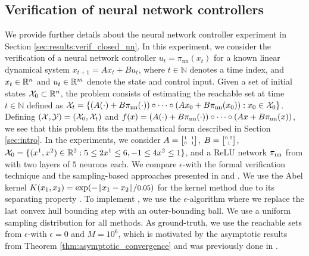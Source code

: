 \documentclass[12pt]{l4dc2022} %
\begin{document}
\subsection{Verification of neural network controllers}\label{apdx:exps:nn}
We provide further details about the neural network controller experiment in Section \ref{sec:results:verif_closed_nn}. 
In this experiment, we consider the verification of a neural network controller $u_t=\pi_{\textrm{nn}}(x_t)$ for a known linear dynamical system $x_{t+1}=Ax_t+Bu_t$, where $t\in\mathbb{N}$ denotes a time index, and $x_t\in\mathbb{R}^n$ and $u_t\in\mathbb{R}^m$ denote the state and control input. %
Given a set of initial states $\mathcal{X}_0\subset\mathbb{R}^n$, 
% 
the problem consists of estimating the reachable set at time $t\in\mathbb{N}$ defined as
$
\mathcal{X}_t=\{(A(\cdot)+B\pi_{\textrm{nn}}(\cdot))\circ\dots\circ 
(Ax_0+B\pi_{\textrm{nn}}(x_0)): x_0\in\mathcal{X}_0\}$. 
Defining $(\mathcal{X},\mathcal{Y})=(\mathcal{X}_0,\mathcal{X}_t)$ and $f(x)=(A(\cdot)+B\pi_{\textrm{nn}}(\cdot))\circ\dots\circ 
(Ax+B\pi_{\textrm{nn}}(x))$, we see that this problem fits the mathematical form described in Section \ref{sec:intro}. %
% 
In the experiments, we consider $A=\SmallMatrix{
1&1\\0&1
}$, $B=\SmallMatrix{
0.5\\1
}$, %
% 
% 
% 
$
% 
% 
% 
% 
% 
% 
% 
% 
% 
% 
% 
% 
% 
% 
\X_0=\{(x^1,x^2)\in\R^2:
5\leq 2x^1\leq 6, -1\leq 4x^2\leq 1
\}
$, and %
% 
a ReLU network $\pi_{\textrm{nn}}$ from \citep{Everett21_journal} with two layers of $5$ neurons each. 
We compare $\epsilon$-\randup with the formal verification technique \reachlp \citep{Everett21_journal} %
% 
and the sampling-based approaches presented in %
\citep{ThorpeL4DC2021} and %
\citep{Gruenbacher2021}. 
% 
We use the Abel kernel $K(x_1,x_2)=\exp(-\|x_1-x_2\|/\scalebox{0.9}{$0.05$})$ for the kernel method \citep{ThorpeL4DC2021} due to its separating property \citep{DeVito2014}. 
% 
To implement \gotube \citep{Gruenbacher2021}, we use the $\epsilon$-\randup algorithm where we replace the last convex hull bounding step with an %
outer-bounding ball. %
% 
We use a uniform sampling distribution for all methods. 
% 
% 
% 
% 
% 
% 
% 
% 
As ground-truth, we use the reachable sets from $\epsilon$-\randup with $\epsilon=0$ and $M=10^6$, which is motivated by the asymptotic results from Theorem \ref{thm:asymptotic_convergence} and was previously done in \citep{Everett21_journal}. 
\end{document}
